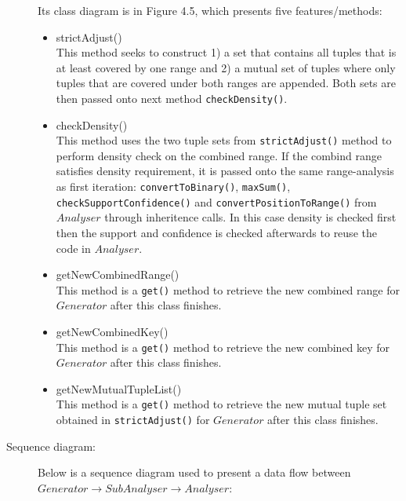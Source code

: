 \begin{description}
Its class diagram is in Figure 4.5, which presents five features/methods:

\begin{itemize}
	\item{strictAdjust()} \\
 	This method seeks to construct 1) a set that contains all tuples that is at least covered by one range and 2) a mutual set of tuples where only tuples that are covered under both ranges are appended. Both sets are then passed onto next method \texttt{checkDensity()}.
	
	\item{checkDensity()} \\
	This method uses the two tuple sets from \texttt{strictAdjust()} method to perform density check on the combined range. If the combind range satisfies density requirement, it is passed onto the same range-analysis as first iteration: \texttt{convertToBinary()}, \texttt{maxSum()}, \texttt{checkSupportConfidence()} and \texttt{convertPositionToRange()} from $Analyser$ through inheritence calls. In this case density is checked first then the support and confidence is checked afterwards to reuse the code in $Analyser$. 
	
	\item{getNewCombinedRange()} \\
	This method is a \texttt{get()} method to retrieve the new combined range for $Generator$ after this class finishes.
	
	\item{getNewCombinedKey()} \\
	This method is a \texttt{get()} method to retrieve the new combined key for $Generator$ after this class finishes.
	
	\item{getNewMutualTupleList()} \\
		This method is a \texttt{get()} method to retrieve the new mutual tuple set obtained in \texttt{strictAdjust()} for $Generator$ after this class finishes.

\end{itemize}

\item[Sequence diagram: ] 

Below is a sequence diagram used to present a data flow between $Generator \rightarrow SubAnalyser \rightarrow Analyser$:


\end{description}
